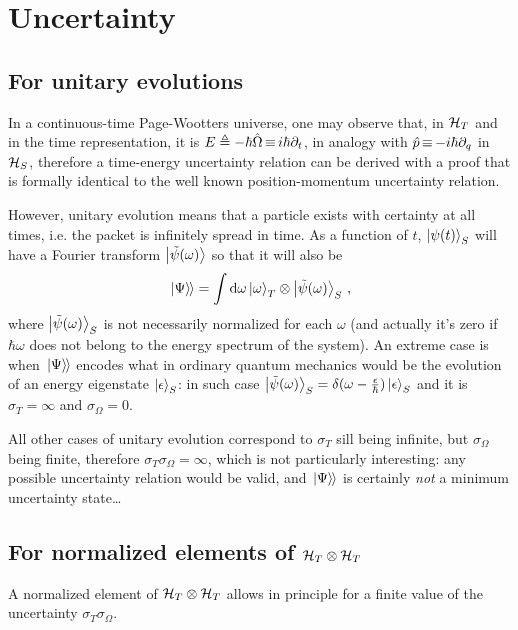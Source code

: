 \section{Uncertainty}

\subsection{For unitary evolutions}

In a continuous-time Page-Wootters universe,
one may observe that,
in $\mathcal{H}_T$ and in the time representation,
it is $E \triangleq -\hbar\hat{\Omega} \operatorname*{\equiv} i\hbar\partial_{t}$,
in analogy with $\hat{p} \operatorname*{\equiv} -i\hbar\partial_{q}$ in $\mathcal{H}_S$,
therefore a time-energy uncertainty relation can be derived
with a proof that is formally identical to the well known
position-momentum uncertainty relation.

However, unitary evolution means that a particle exists with
certainty at all times, i.e. the packet
is infinitely spread in time.
%
As a function of $t$, $\ket{\psi(t)}_S$ will have a Fourier transform
$\ket{\tilde{\psi}(\omega)}$
so that it will also be
\[
  \left.\left| \Psi \right\rangle\hspace{-0.115em}\right\rangle = \int \dd \omega \ket{\omega}_T \otimes \ket{\tilde{\psi}(\omega)}_S \, \text{,}
\]
where $\ket{\tilde{\psi}(\omega)}_S$ is not necessarily normalized for each $\omega$
(and actually it's zero if $\hbar\omega$ does not belong to the energy spectrum of the system).
An extreme case is when $\left.\left| \Psi \right\rangle\hspace{-0.115em}\right\rangle$ encodes what in ordinary quantum mechanics would be the evolution
of an energy eigenstate $\ket{\epsilon}_S$: in such case
$\ket{\tilde{\psi}(\omega)}_S = \delta(\omega - \frac{\epsilon}{\hbar})\ket{\epsilon}_S$
and it is $\sigma_{T} = \infty$ and $\sigma_{\Omega} = 0$.

All other cases of unitary evolution correspond to $\sigma_{T}$
sill being infinite, but $\sigma_{\Omega}$ being finite, therefore
$\sigma_{T}\sigma_{\Omega} = \infty$, which is not particularly interesting:
any possible uncertainty relation would be valid, and $\left.\left| \Psi \right\rangle\hspace{-0.115em}\right\rangle$
is certainly \emph{not} a minimum uncertainty state\dots 

\subsection{For normalized elements of $\mathcal{H}_T \otimes \mathcal{H}_T$}

A normalized element of $\mathcal{H}_T \otimes \mathcal{H}_T$ allows in principle for a finite value
of the uncertainty $\sigma_{T}\sigma_{\Omega}$.

